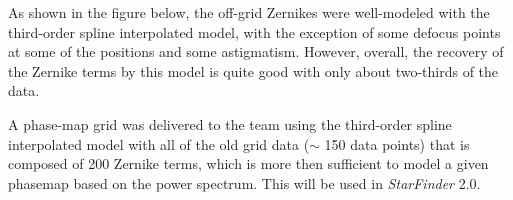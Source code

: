 As shown in the figure below, the off-grid Zernikes were well-modeled with the third-order spline interpolated model, with the exception of some defocus points at some of the positions and some astigmatism. However, overall, the recovery of the Zernike terms by this model is quite good with only about two-thirds of the data. 

A phase-map grid was delivered to the team using the third-order spline interpolated model with all of the old grid data ($\sim$ 150 data points) that is composed of 200 Zernike terms, which is more then sufficient to model a given phasemap based on the power spectrum. This will be used in \textit{StarFinder} 2.0.
    
    
    
  
  